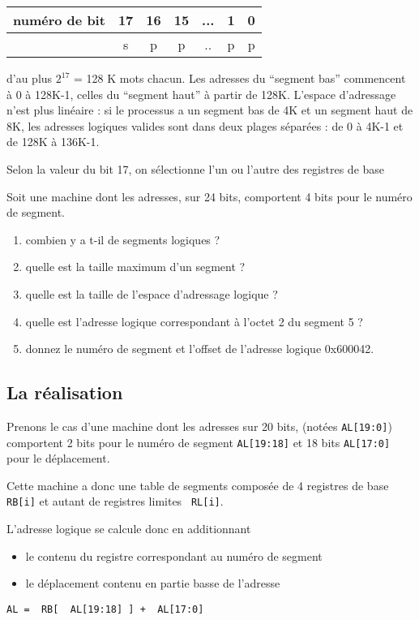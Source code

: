 \begin{multicols}{2}
\begin{tabular}{|c||c|ccccc|}
\hline
numéro de bit & 17 &16 &15& ... & 1 &0 \\
\hline
& s & p & p & .. & p & p \\
\hline
\end{tabular}

d'au plus $2^{17}$ = 128 K mots chacun. Les adresses du ``segment
bas'' commencent à 0 à 128K-1, celles du ``segment haut'' à partir de
128K.  L'espace d'adressage n'est plus linéaire : si le processus a un
segment bas de 4K et un segment haut de 8K, les adresses logiques
valides sont dans deux plages séparées : de 0 à 4K-1 et de 128K à
136K-1.

Selon la valeur du bit 17, on sélectionne l'un ou l'autre des 
registres de base


\begin{exercice}
Soit une machine dont les adresses, sur 24 bits, comportent 4 bits
pour le numéro de segment.
\begin{enumerate}
\item combien y a t-il de segments logiques ?
\item quelle est la taille maximum d'un segment ?
\item quelle est la taille de l'espace d'adressage logique ?
\item quelle est l'adresse logique correspondant à l'octet 2 
du segment 5 ?
\item donnez le numéro de segment et l'offset de l'adresse 
logique 0x600042.
\end{enumerate}
\end{exercice}

\subsection{La réalisation}

Prenons le cas d'une machine dont les adresses sur 20 bits, (notées
\texttt{AL[19:0]}) comportent 2 bits pour le numéro de segment
\texttt{AL[19:18]} et 18 bits \texttt{AL[17:0]} pour le déplacement.

Cette machine a donc une table de segments composée de 4 registres de
base \texttt{RB[i]} et autant de registres limites \texttt{ RL[i]}.

L'adresse logique se calcule donc en additionnant
\begin{itemize}
\item le contenu du registre correspondant au numéro de segment
\item  le déplacement contenu en partie basse de l'adresse
\end{itemize}
\begin{lstlisting}
AL =  RB[  AL[19:18] ] +  AL[17:0]
\end{lstlisting}


\end{multicols}
